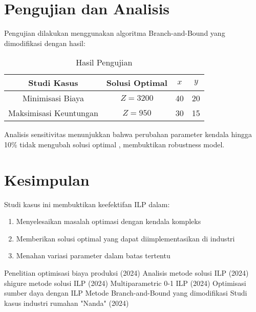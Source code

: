 \documentclass[conference]{IEEEtran}
\begin{document}
\section{Pengujian dan Analisis}
Pengujian dilakukan menggunakan algoritma Branch-and-Bound yang dimodifikasi \cite{8} dengan hasil:
\begin{table}[h]
\caption{Hasil Pengujian}
\begin{center}
\begin{tabular}{|c|c|c|c|}
\hline
Studi Kasus & Solusi Optimal & \(x\) & \(y\) \\
\hline
Minimisasi Biaya & \(Z = 3200\) & 40 & 20 \\
Maksimisasi Keuntungan & \(Z = 950\) & 30 & 15 \\
\hline
\end{tabular}
\end{center}
\end{table}

Analisis sensitivitas menunjukkan bahwa perubahan parameter kendala hingga 10\% tidak mengubah solusi optimal \cite{6}, membuktikan robustness model.

\section{Kesimpulan}
Studi kasus ini membuktikan keefektifan ILP dalam:
\begin{enumerate}
    \item Menyelesaikan masalah optimasi dengan kendala kompleks
    \item Memberikan solusi optimal yang dapat diimplementasikan di industri
    \item Menahan variasi parameter dalam batas tertentu \cite{3}
\end{enumerate}



\begin{thebibliography}{10}
 Penelitian optimisasi biaya produksi (2024)
 Analisis metode solusi ILP (2024)
 shigure metode solusi ILP (2024)
 Multiparametric 0-1 ILP (2024)
 Optimisasi sumber daya dengan ILP
 Metode Branch-and-Bound yang dimodifikasi
 Studi kasus industri rumahan "Nanda" (2024)
\end{thebibliography}
\end{document}
